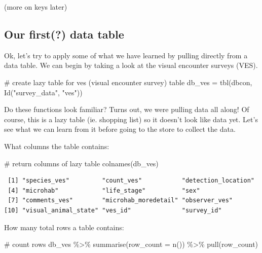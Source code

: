 \documentclass[
  letterpaper,
  DIV=11,
  numbers=noendperiod]{scrartcl}
\newenvironment{Shaded}{\begin{snugshade}}{\end{snugshade}}
\newcommand{\AttributeTok}[1]{\textcolor[rgb]{0.40,0.45,0.13}{#1}}
\newcommand{\CommentTok}[1]{\textcolor[rgb]{0.37,0.37,0.37}{#1}}
\newcommand{\FunctionTok}[1]{\textcolor[rgb]{0.28,0.35,0.67}{#1}}
\newcommand{\NormalTok}[1]{\textcolor[rgb]{0.00,0.23,0.31}{#1}}
\newcommand{\OtherTok}[1]{\textcolor[rgb]{0.00,0.23,0.31}{#1}}
\newcommand{\SpecialCharTok}[1]{\textcolor[rgb]{0.37,0.37,0.37}{#1}}
\newcommand{\StringTok}[1]{\textcolor[rgb]{0.13,0.47,0.30}{#1}}
\begin{document}
(more on keys later)

\subsection{Our first(?) data table}\label{our-first-data-table}

Ok, let's try to apply some of what we have learned by pulling directly
from a data table. We can begin by taking a look at the visual encounter
surveys (VES).

\begin{Shaded}
\begin{Highlighting}[]
\CommentTok{\# create lazy table for ves (visual encounter survey) table}
\NormalTok{db\_ves }\OtherTok{=} \FunctionTok{tbl}\NormalTok{(dbcon, }\FunctionTok{Id}\NormalTok{(}\StringTok{"survey\_data"}\NormalTok{, }\StringTok{"ves"}\NormalTok{))}
\end{Highlighting}
\end{Shaded}

Do these functions look familiar? Turns out, we were pulling data all
along! Of course, this is a lazy table (ie. shopping list) so it doesn't
look like data yet. Let's see what we can learn from it before going to
the store to collect the data.

What columns the table contains:

\begin{Shaded}
\begin{Highlighting}[]
\CommentTok{\# return columns of lazy table}
\FunctionTok{colnames}\NormalTok{(db\_ves)}
\end{Highlighting}
\end{Shaded}

\begin{verbatim}
 [1] "species_ves"         "count_ves"           "detection_location" 
 [4] "microhab"            "life_stage"          "sex"                
 [7] "comments_ves"        "microhab_moredetail" "observer_ves"       
[10] "visual_animal_state" "ves_id"              "survey_id"          
\end{verbatim}

How many total rows a table contains:

\begin{Shaded}
\begin{Highlighting}[]
\CommentTok{\# count rows}
\NormalTok{db\_ves }\SpecialCharTok{\%\textgreater{}\%}
  \FunctionTok{summarise}\NormalTok{(}\AttributeTok{row\_count =} \FunctionTok{n}\NormalTok{()) }\SpecialCharTok{\%\textgreater{}\%}
  \FunctionTok{pull}\NormalTok{(row\_count)}
\end{Highlighting}
\end{Shaded}
\end{document}
